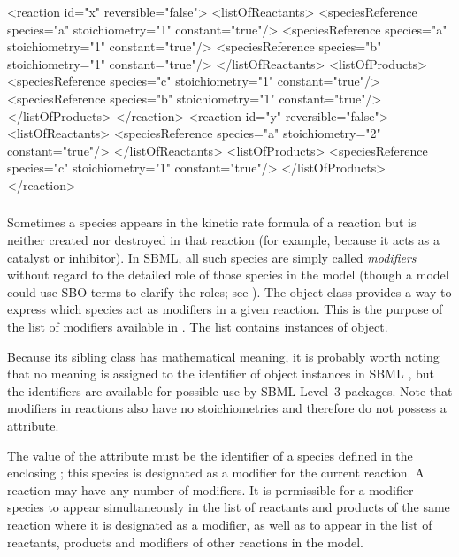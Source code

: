 \begin{example}
<reaction id="x" reversible="false">
    <listOfReactants>
        <speciesReference species="a" stoichiometry="1" constant="true"/>
        <speciesReference species="a" stoichiometry="1" constant="true"/>
        <speciesReference species="b" stoichiometry="1" constant="true"/>
    </listOfReactants>
    <listOfProducts>
        <speciesReference species="c" stoichiometry="1" constant="true"/>
        <speciesReference species="b" stoichiometry="1" constant="true"/>
    </listOfProducts>
</reaction>
<reaction id="y" reversible="false">
    <listOfReactants>
        <speciesReference species="a" stoichiometry="2" constant="true"/>
    </listOfReactants>
    <listOfProducts>
        <speciesReference species="c" stoichiometry="1" constant="true"/>
    </listOfProducts>
</reaction>
\end{example}



\subsubsection{}
\label{subsec:modifierreference}

Sometimes a species appears in the kinetic rate formula of a
reaction but is neither created nor destroyed in that reaction
(for example, because it acts as a catalyst or inhibitor).  In
SBML, all such species are simply called \emph{modifiers} without
regard to the detailed role of those species in the model (though
a model could use SBO terms to clarify the roles; see
).  The \Reaction object class provides a way
to express which species act as modifiers in a given reaction.
This is the purpose of the list of modifiers available in
\Reaction.  The list contains instances of
\ModifierSpeciesReference object.

Because its sibling class \SpeciesReference has mathematical meaning, it is probably worth noting that no meaning is
assigned to the identifier of \ModifierSpeciesReference object
instances in SBML \thisLV, but the identifiers are available for
possible use by SBML Level~3 packages.  Note that modifiers
in reactions also have no stoichiometries and therefore do not
possess a  attribute.

The value of the  attribute must be the identifier of a
species defined in the enclosing \Model; this species is
designated as a modifier for the current reaction.  A reaction may
have any number of modifiers.  It is permissible for a modifier
species to appear simultaneously in the list of reactants and
products of the same reaction where it is designated as a
modifier, as well as to appear in the list of reactants, products
and modifiers of other reactions in the model.


